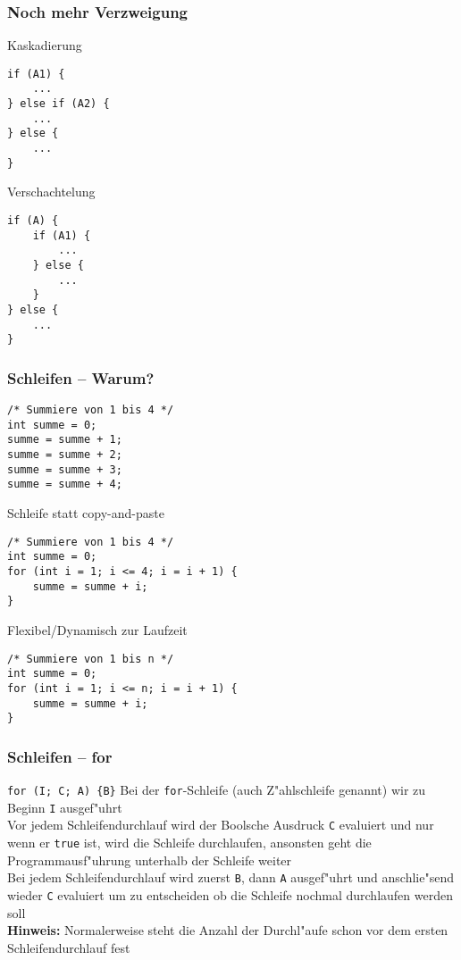 \documentclass{beamer}
\begin{document}
\begin{frame}[containsverbatim]
\frametitle{Noch mehr Verzweigung}
\begin{block}{Kaskadierung}
\begin{lstlisting}
if (A1) {
	...
} else if (A2) {
	...
} else {
	...
}
\end{lstlisting}
\end{block}

\begin{block}{Verschachtelung}
\begin{lstlisting}
if (A) {
	if (A1) {
		...
	} else {
		...
	}
} else {
	...
}
\end{lstlisting}
\end{block}
\end{frame}


\begin{frame}[containsverbatim]
\frametitle{Schleifen -- Warum?}
\begin{lstlisting}
/* Summiere von 1 bis 4 */
int summe = 0;
summe = summe + 1;
summe = summe + 2;
summe = summe + 3;
summe = summe + 4;
\end{lstlisting}

\begin{block}{Schleife statt copy-and-paste}
\begin{lstlisting}
/* Summiere von 1 bis 4 */
int summe = 0;
for (int i = 1; i <= 4; i = i + 1) {
	summe = summe + i;
}
\end{lstlisting}
\end{block}

\begin{block}{Flexibel/Dynamisch zur Laufzeit}
\begin{lstlisting}
/* Summiere von 1 bis n */
int summe = 0;
for (int i = 1; i <= n; i = i + 1) {
	summe = summe + i;
}
\end{lstlisting}
\end{block}
\end{frame}


\begin{frame}
\frametitle{Schleifen -- for}
\begin{block}{\texttt{for (I; C; A) \{B\}}}
Bei der \texttt{for}-Schleife (auch Z"ahlschleife genannt) wir zu Beginn \texttt{I} ausgef"uhrt\\
Vor jedem Schleifendurchlauf wird der Boolsche Ausdruck \texttt{C} evaluiert und nur wenn er \texttt{true} ist, wird die Schleife durchlaufen, ansonsten geht die Programmausf"uhrung unterhalb der Schleife weiter\\
Bei jedem Schleifendurchlauf wird zuerst \texttt{B}, dann \texttt{A} ausgef"uhrt und anschlie"send wieder \texttt{C} evaluiert um zu entscheiden ob die Schleife nochmal durchlaufen werden soll\\[0.5em]
\textbf{Hinweis:} Normalerweise steht die Anzahl der Durchl"aufe schon vor dem ersten Schleifendurchlauf fest
\end{block}
\end{frame}
\end{document}
